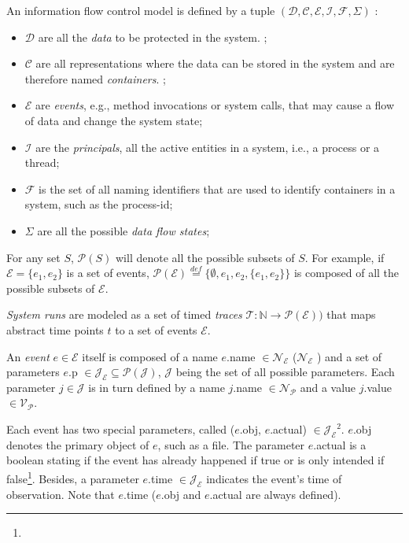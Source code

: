 An information flow control model is defined by a tuple $(\mathcal{D}, \mathcal{C}, \mathcal{E}, \mathcal{I}, \mathcal{F},\Sigma)$ \cite{Kelbert2018,Fromm2020}:
\begin{itemize}
    \item $\mathcal{D}$ are all the \emph{data} to be protected in the system. ;
    \item $\mathcal{C}$ are all representations where the data can be stored in the system and are therefore named \emph{containers}. ;
    \item $\mathcal{E}$ are \emph{events}, e.g., method invocations or system calls, that may cause a flow of data and change the system state;
    \item $\mathcal{I}$ are the \emph{principals}, all the active entities in a system, i.e., a process or a thread;
    \item $\mathcal{F}$ is the set of all naming identifiers that are used to identify containers in a system, such as the process-id;
    \item $\Sigma$ are all the possible \emph{data flow states};
\end{itemize}

For any set $S$, $\mathcal{P}(S)$ will denote all the possible subsets of $S$. For example, if $\mathcal{E}=\{e_1,e_2\}$ is a set of events, $\mathcal{P}(\mathcal{E})  \overset{def}{=} \{\emptyset, e_1, e_2, \{e_1,e_2\}\}$ is composed of all the possible subsets of $\mathcal{E}$.  

 \emph{System runs} are modeled as a set of timed \emph{traces} $\mathcal{T}: \mathbb{N} \to \mathcal{P(\mathcal{E}))}$ that maps abstract time points $t$ to a set of events $\mathcal{E}$.

An \emph{event} $e \in \mathcal{E}$ itself is composed of a name $e$.name $ \in \mathcal{N_{E}}$ ($\mathcal{N_{E}}$ ) and a set of parameters $e$.p $ \in \mathcal{J_{E}} \subseteq \mathcal{P(J)}$, $\mathcal{J}$ being the set of all possible parameters. Each parameter $j \in \mathcal{J}$ is in turn defined by a name $j$.name $\in \mathcal{N_{P}}$ and a value $j$.value $\in \mathcal{V_{P}}$.

Each event has two special parameters, called ($e$.obj, $e$.actual) $\in \mathcal{J_{E}}^{2}$. $e$.obj denotes the primary object of $e$, such as a file. The parameter $e$.actual is a boolean stating if the event has already happened if true or is only intended if false\footnote{}. Besides, a parameter $e$.time $\in \mathcal{J_{E}}$ indicates the event's time of observation. Note that $e$.time  ($e$.obj and $e$.actual are always defined).
 
